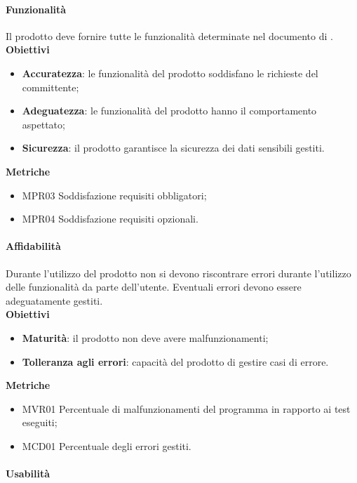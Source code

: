 \paragraph{Funzionalità}

Il prodotto deve fornire tutte le funzionalità determinate nel documento di \AdR{} \versAdR{}. \\

\textbf{Obiettivi}
\begin{itemize}
\item \textbf{Accuratezza}: le funzionalità del prodotto soddisfano le richieste del committente;
\item \textbf{Adeguatezza}: le funzionalità del prodotto hanno il comportamento aspettato;
\item \textbf{Sicurezza}: il prodotto garantisce la sicurezza dei dati sensibili gestiti.
\end{itemize}

\textbf{Metriche}
\begin{itemize}
\item MPR03 Soddisfazione requisiti obbligatori;
\item MPR04 Soddisfazione requisiti opzionali.
\end{itemize}

\paragraph{Affidabilità}

Durante l'utilizzo del prodotto non si devono riscontrare errori durante l'utilizzo delle funzionalità da parte dell'utente. Eventuali errori devono essere adeguatamente gestiti. \\

\textbf{Obiettivi}
\begin{itemize}
\item \textbf{Maturità}: il prodotto non deve avere malfunzionamenti;
\item \textbf{Tolleranza agli errori}: capacità del prodotto di gestire casi di errore.
\end{itemize}

\textbf{Metriche}
\begin{itemize}
\item MVR01 Percentuale di malfunzionamenti del programma in rapporto ai test eseguiti;
\item MCD01 Percentuale degli errori gestiti.
\end{itemize}

\paragraph{Usabilità}

